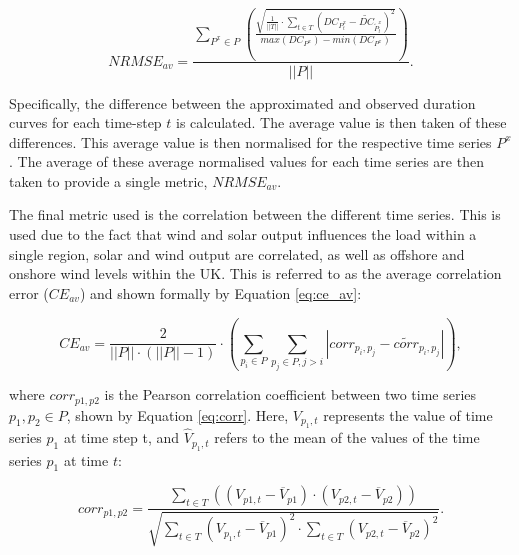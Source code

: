 \begin{equation}
\label{eq:nrmse_av}
NRMSE_{av}=\frac
{\sum\limits_{P^x{\in} P}\left(\frac
	{\sqrt{
			\frac{1}{\left|\left|T\right|\right|}
			\cdot
			\sum\limits_{t\in T}(DC_{P^x_t}-\widetilde{DC}_{\widetilde{P}^x_t})^2}
	}
	{max(DC_{P^x})-min(DC_{P^x})}
	\right)}
{\left|\left|P\right|\right|}.
\end{equation}

Specifically, the difference between the approximated and observed duration curves for each time-step $t$ is calculated. The average value is then taken of these differences. This average value is then normalised for the respective time series $P^x$. The average of these average normalised values for each time series are then taken to provide a single metric, $NRMSE_{av}$.



The final metric used is the correlation between the different time series. This is used due to the fact that wind and solar output influences the load within a single region, solar and wind output are correlated, as well as offshore and onshore wind levels within the UK. This is referred to as the average correlation error ($CE_{av}$) and shown formally by Equation \ref{eq:ce_av}:


\begin{equation}
\label{eq:ce_av}
CE_{av}=\frac{2}{\left|\left|P\right|\right|\cdot(\left|\left|P\right|\right|-1)}\cdot
\left(
\sum\limits_{p_i\in P}\sum\limits_{p_j\in P,j>i}
\left|
corr_{p_i,p_j}-\widetilde{corr}_{p_i,p_j}
\right|
\right),
\end{equation}

\noindent where $corr_{p1,p2}$ is the Pearson correlation coefficient between two time series $p_1,p_2\in P$, shown by Equation \ref{eq:corr}. Here, $V_{p_1,t}$ represents the value of time series $p_1$ at time step t, and $\hat{V}_{p_1,t}$ refers to the mean of the values of the time series $p_1$ at time $t$:

\begin{equation}
\label{eq:corr}
corr_{p1,p2}=\frac
{\sum\limits_{t\in T}\left(\left(V_{p1,t}-\overline{V}_{p1}\right)\cdot\left(V_{p2,t}-\overline{V}_{p2}\right)\right)}
{\sqrt{
		\sum\limits_{t\in T} \left(V_{p_1,t}-\overline{V}_{p1}\right)^2\cdot\sum\limits_{t\in T}\left(V_{p2,t}-\overline{V}_{p2}\right)^2
}}.
\end{equation}













